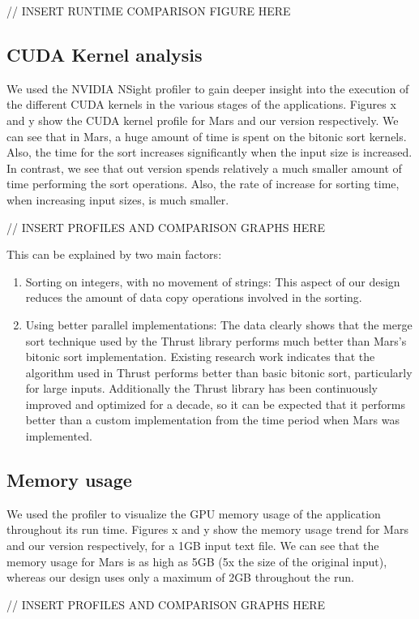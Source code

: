 \documentclass{article}
\begin{document}
// INSERT RUNTIME COMPARISON FIGURE HERE

\subsection{CUDA Kernel analysis}
We used the NVIDIA NSight profiler to gain deeper insight into the execution of the different CUDA kernels in the various stages of the applications. Figures x and y show the CUDA kernel profile for Mars and our version respectively. We can see that in Mars, a huge amount of time is spent on the bitonic sort kernels. Also, the time for the sort increases significantly when the input size is increased. In contrast, we see that out version spends relatively a much smaller amount of time performing the sort operations. Also, the rate of increase for sorting time, when increasing input sizes, is much smaller.

// INSERT PROFILES AND COMPARISON GRAPHS HERE

This can be explained by two main factors:
\begin{enumerate}
    \item Sorting on integers, with no movement of strings: This aspect of our design reduces the amount of data copy operations involved in the sorting.
    \item Using better parallel implementations: The data clearly shows that the merge sort technique used by the Thrust library performs much better than Mars's bitonic sort implementation. Existing research work indicates that the algorithm used in Thrust performs better than basic bitonic sort, particularly for large inputs. Additionally the Thrust library has been continuously improved and optimized for a decade, so it can be expected that it performs better than a custom implementation from the time period when Mars was implemented.
\end{enumerate}


\subsection{Memory usage}
We used the profiler to visualize the GPU memory usage of the application throughout its run time. Figures x and y show the memory usage trend for Mars and our version respectively, for a 1GB input text file. We can see that the memory usage for Mars is as high as 5GB (5x the size of the original input), whereas our design uses only a maximum of 2GB throughout the run. 

// INSERT PROFILES AND COMPARISON GRAPHS HERE
\end{document}

